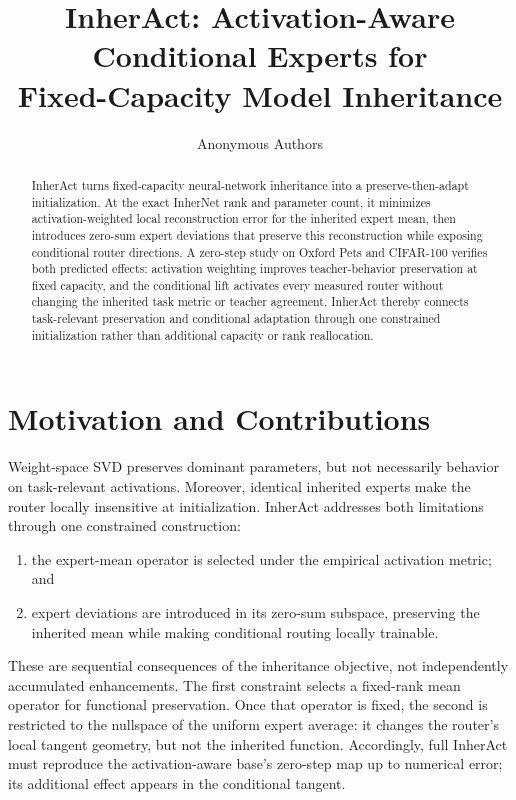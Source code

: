 \documentclass{article}
\title{\textbf{InherAct}: Activation-Aware Conditional Experts for\\
Fixed-Capacity Model Inheritance}
\author{Anonymous Authors}
\date{}
\begin{document}
\maketitle

\begin{abstract}
InherAct turns fixed-capacity neural-network inheritance into a
preserve-then-adapt initialization.  At the exact InherNet rank and parameter
count, it minimizes activation-weighted local reconstruction error for the
inherited expert mean, then introduces zero-sum expert deviations that preserve
this reconstruction while exposing conditional router directions.  A
zero-step study on Oxford Pets and CIFAR-100 verifies both predicted effects:
activation weighting improves teacher-behavior preservation at fixed capacity,
and the conditional lift activates every measured router without changing the
inherited task metric or teacher agreement.  InherAct thereby connects
task-relevant preservation and conditional adaptation through one constrained
initialization rather than additional capacity or rank reallocation.
\end{abstract}

\section{Motivation and Contributions}

Weight-space SVD preserves dominant parameters, but not necessarily behavior
on task-relevant activations.  Moreover, identical inherited experts make the
router locally insensitive at initialization.  InherAct addresses both
limitations through one constrained construction:
\begin{enumerate}
  \item the expert-mean operator is selected under the empirical activation
        metric; and
  \item expert deviations are introduced in its zero-sum subspace, preserving
        the inherited mean while making conditional routing locally trainable.
\end{enumerate}
These are sequential consequences of the inheritance objective, not
independently accumulated enhancements.  The first constraint selects a
fixed-rank mean operator for functional preservation.  Once that operator is
fixed, the second is restricted to the nullspace of the uniform expert average:
it changes the router's local tangent geometry, but not the inherited function.
Accordingly, full InherAct must reproduce the activation-aware base's zero-step
map up to numerical error; its additional effect appears in the conditional
tangent.
\end{document}
